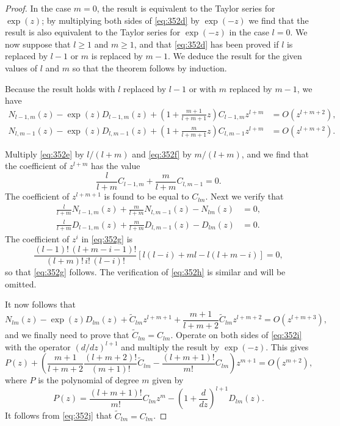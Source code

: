 \begin{proof}
In the case $m = 0$, the result is equivalent to the Taylor series for $\exp(z)$; by multiplying both sides of \eqref{eq:352d} by $\exp(-z)$ we find that the result is also equivalent to the Taylor series for $\exp(-z)$ in the case $l = 0$. We now suppose that $l \geq 1$ and $m \geq 1$, and that \eqref{eq:352d} has been proved if $l$ is replaced by $l - 1$ or $m$ is replaced by $m - 1$. We deduce the result for the given values of $l$ and $m$ so that the theorem follows by induction.

Because the result holds with $l$ replaced by $l - 1$ or with $m$ replaced by $m - 1$, we have
\begin{align}
N_{l-1,m}(z) - \exp(z) D_{l-1,m}(z) + \left(1 + \frac{m+1}{l+m+1} z\right) C_{l-1,m} z^{l+m} &= O(z^{l+m+2}), \tag{352e} \\
N_{l,m-1}(z) - \exp(z) D_{l,m-1}(z) + \left(1 + \frac{m}{l+m+1} z\right) C_{l,m-1} z^{l+m} &= O(z^{l+m+2}). \tag{352f}
\end{align}

Multiply \eqref{eq:352e} by $l/(l+m)$ and \eqref{eq:352f} by $m/(l+m)$, and we find that the coefficient of $z^{l+m}$ has the value
\[
\frac{l}{l+m} C_{l-1,m} + \frac{m}{l+m} C_{l,m-1} = 0.
\]
The coefficient of $z^{l+m+1}$ is found to be equal to $C_{lm}$. Next we verify that
\begin{align}
\frac{l}{l+m} N_{l-1,m}(z) + \frac{m}{l+m} N_{l,m-1}(z) - N_{lm}(z) &= 0, \tag{352g} \\
\frac{l}{l+m} D_{l-1,m}(z) + \frac{m}{l+m} D_{l,m-1}(z) - D_{lm}(z) &= 0. \tag{352h}
\end{align}
The coefficient of $z^{i}$ in \eqref{eq:352g} is
\[
\frac{(l-1)!\,(l+m-i-1)!}{(l+m)!\,i!\,(l-i)!} \left[ l(l-i) + ml - l(l+m-i) \right] = 0,
\]
so that \eqref{eq:352g} follows. The verification of \eqref{eq:352h} is similar and will be omitted.

It now follows that
\[
N_{lm}(z) - \exp(z) D_{lm}(z) + \widetilde{C}_{lm} z^{l+m+1} + \frac{m+1}{l+m+2} \widetilde{C}_{lm} z^{l+m+2} = O(z^{l+m+3}), \tag{352i}
\]
and we finally need to prove that $\widetilde{C}_{lm} = C_{lm}$. Operate on both sides of \eqref{eq:352i} with the operator $(d/dz)^{l+1}$ and multiply the result by $\exp(-z)$. This gives
\[
P(z) + \left( \frac{m+1}{l+m+2} \frac{(l+m+2)!}{(m+1)!} \widetilde{C}_{lm} - \frac{(l+m+1)!}{m!} C_{lm} \right) z^{m+1} = O(z^{m+2}), \tag{352j}
\]
where $P$ is the polynomial of degree $m$ given by
\[
P(z) = \frac{(l+m+1)!}{m!} C_{lm} z^{m} - \left(1 + \frac{d}{dz}\right)^{l+1} D_{lm}(z).
\]
It follows from \eqref{eq:352j} that $\widetilde{C}_{lm} = C_{lm}$.
\end{proof}

